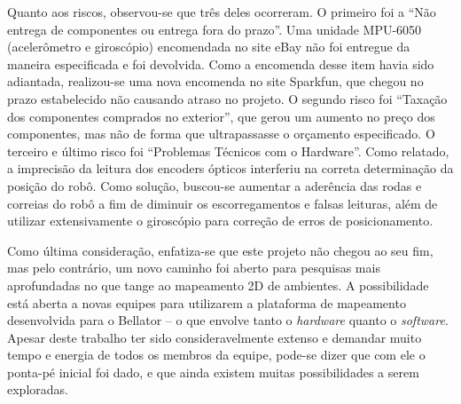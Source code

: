 Quanto aos riscos, observou-se que três deles ocorreram. O primeiro foi a ``Não entrega de componentes ou entrega fora do prazo''. Uma unidade MPU-6050 (acelerômetro e giroscópio) encomendada no site eBay não foi entregue da maneira especificada e foi devolvida. Como a encomenda desse item havia sido adiantada, realizou-se uma nova encomenda no site Sparkfun, que chegou no prazo estabelecido não causando atraso no projeto. O segundo risco foi ``Taxação dos componentes comprados no exterior'', que gerou um aumento no preço dos componentes, mas não de forma que ultrapassasse o orçamento especificado. O terceiro e último risco foi ``Problemas Técnicos com o Hardware''. Como relatado, a imprecisão da leitura dos encoders ópticos interferiu na correta determinação da posição do robô. Como solução, buscou-se aumentar a aderência das rodas e correias do robô a fim de diminuir os escorregamentos e falsas leituras, além de utilizar extensivamente o giroscópio para correção de erros de posicionamento.

Como última consideração, enfatiza-se que este projeto não chegou ao seu fim, mas pelo contrário, um novo caminho foi aberto para pesquisas mais aprofundadas no que tange ao mapeamento 2D de ambientes. A possibilidade está aberta a novas equipes para utilizarem a plataforma de mapeamento desenvolvida para o Bellator -- o que envolve tanto o \textit{hardware} quanto o \textit{software}. Apesar deste trabalho ter sido consideravelmente extenso e demandar muito tempo e energia de todos os membros da equipe, pode-se dizer que com ele o ponta-pé inicial foi dado, e que ainda existem muitas possibilidades a serem exploradas.


%


